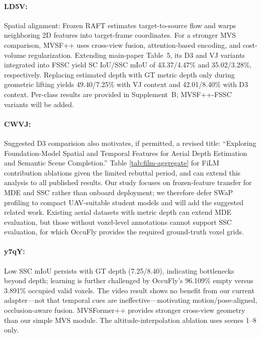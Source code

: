 \documentclass[10pt,twocolumn,letterpaper]{article}
\begin{document}
\paragraph{LD5V:}
Spatial alignment: Frozen RAFT estimates target-to-source flow and warps neighboring 2D features into target-frame coordinates. For a stronger MVS comparison, MVSF++ uses cross-view fusion, attention-based encoding, and cost-volume regularization. Extending main-paper Table~5, its D3 and VJ variants integrated into FSSC yield SC IoU/SSC mIoU of 43.37/4.47\% and 35.02/3.28\%, respectively. Replacing estimated depth with GT metric depth only during geometric lifting yields 49.40/7.25\% with VJ context and 42.01/8.40\% with D3 context. Per-class results are provided in Supplement~B; MVSF++-FSSC variants will be added.

\paragraph{CWVJ:}
Suggested D3 comparision also motivates, if permitted, a revised title:
``Exploring Foundation-Model Spatial and Temporal Features for Aerial Depth Estimation and Semantic Scene Completion.''
Table \ref{tab:film-aggregate} for FiLM contribution ablations given the limited rebuttal period, and can extend this analysis to all published results.
Our study focuses on frozen-feature transfer for MDE and SSC rather than onboard deployment; we therefore defer SWaP profiling to compact UAV-suitable student models and will add the suggested related work. Existing aerial datasets with metric depth can extend MDE evaluation, but those without voxel-level annotations cannot support SSC evaluation, for which OccuFly provides the required ground-truth voxel grids.


\paragraph{y7qY:}
Low SSC mIoU persists with GT depth (7.25/8.40), indicating bottlenecks beyond depth; learning is further challenged by OccuFly’s 96.109\% empty versus 3.891\% occupied valid voxels. The video result shows no benefit from our current adapter—not that temporal cues are ineffective—motivating motion/pose-aligned, occlusion-aware fusion. MVSFormer++ provides stronger cross-view geometry than our simple MVS module. The altitude-interpolation ablation uses scenes 1–8 only.
\end{document}
